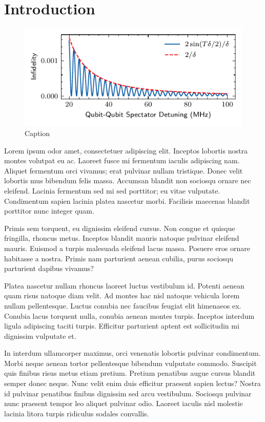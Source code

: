 
\section{Introduction}

\begin{figure}[t]
    \centering
    \includegraphics[width=0.95\columnwidth]{figures/fidelity_vs_detuning_up.pdf}
    \caption{Caption}
    \label{fig:enter-label}
\end{figure}

Lorem ipsum odor amet, consectetuer adipiscing elit. Inceptos lobortis nostra montes volutpat eu ac. Laoreet fusce mi fermentum iaculis adipiscing nam. Aliquet fermentum orci vivamus; erat pulvinar nullam tristique. Donec velit lobortis mus bibendum felis massa. Accumsan blandit non sociosqu ornare nec eleifend. Lacinia fermentum sed mi sed porttitor; eu vitae vulputate. Condimentum sapien lacinia platea nascetur morbi. Facilisis maecenas blandit porttitor nunc integer quam.

Primis sem torquent, eu dignissim eleifend cursus. Non congue et quisque fringilla, rhoncus metus. Inceptos blandit mauris natoque pulvinar eleifend mauris. Euismod a turpis malesuada eleifend lacus massa. Posuere eros ornare habitasse a nostra. Primis nam parturient aenean cubilia, purus sociosqu parturient dapibus vivamus?

Platea nascetur nullam rhoncus laoreet luctus vestibulum id. Potenti aenean quam risus natoque diam velit. Ad montes hac nisl natoque vehicula lorem nullam pellentesque. Luctus conubia nec faucibus feugiat elit himenaeos ex. Conubia lacus torquent nulla, conubia aenean montes turpis. Inceptos interdum ligula adipiscing taciti turpis. Efficitur parturient aptent est sollicitudin mi dignissim vulputate et.

In interdum ullamcorper maximus, orci venenatis lobortis pulvinar condimentum. Morbi neque aenean tortor pellentesque bibendum vulputate commodo. Suscipit quis finibus risus metus etiam pretium. Pretium penatibus augue cursus blandit semper donec neque. Nunc velit enim duis efficitur praesent sapien lectus? Nostra id pulvinar penatibus finibus dignissim sed arcu vestibulum. Sociosqu pulvinar nunc praesent tempor leo aliquet pulvinar odio. Laoreet iaculis nisl molestie lacinia litora turpis ridiculus sodales convallis.


